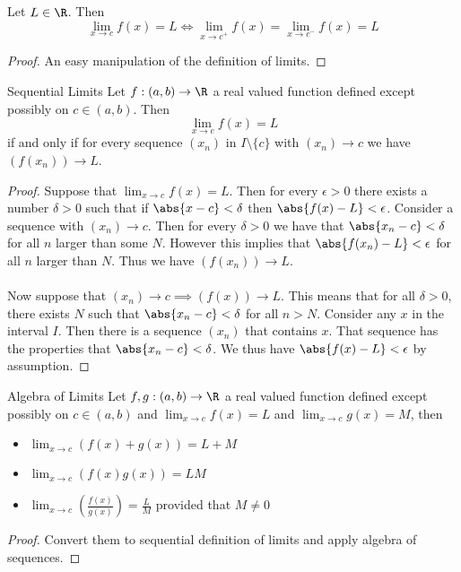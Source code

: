 \begin{lmm}{}{} Let $L\in\R$. Then $$\lim_{x\to c}f(x)=L\iff\lim_{x\to c^+}f(x)=\lim_{x\to c^-}f(x)=L$$ \tcbline
\begin{proof} An easy manipulation of the definition of limits. 
\end{proof}
\end{lmm}

\begin{thm}{Sequential Limits}{} Let $f:(a,b)\to\R$ a real valued function defined except possibly on $c\in(a,b)$. Then $$\lim_{x\to c}f(x)=L$$ if and only if for every sequence $(x_n)$ in $I\setminus\{c\}$ with $(x_n)\to c$ we have $(f(x_n))\to L$. \tcbline
\begin{proof} Suppose that $\lim_{x\to c}f(x)=L$. Then for every $\epsilon>0$ there exists a number $\delta>0$ such that if $\abs{x-c}<\delta$ then $\abs{f(x)-L}<\epsilon$. Consider a sequence with $(x_n)\to c$. Then for every $\delta>0$ we have that $\abs{x_n-c}<\delta$ for all $n$ larger than some $N$. However this implies that $\abs{f(x_n)-L}<\epsilon$ for all $n$ larger than $N$. Thus we have $(f(x_n))\to L$. \\~\\ 
Now suppose that $(x_n)\to c\implies (f(x))\to L$. This means that for all $\delta>0$, there exists $N$ such that $\abs{x_n-c}<\delta$ for all $n>N$. Consider any $x$ in the interval $I$. Then there is a sequence $(x_n)$ that contains $x$. That sequence has the properties that $\abs{x_n-c}<\delta$. We thus have $\abs{f(x)-L}<\epsilon$ by assumption. 
\end{proof}
\end{thm}

\begin{prp}{Algebra of Limits}{} Let $f,g:(a,b)\to\R$ a real valued function defined except possibly on $c\in(a,b)$ and $\lim_{x\to c}f(x)=L$ and $\lim_{x\to c}g(x)=M$, then
\begin{itemize}
\item $\lim_{x\to c}\left(f(x)+g(x)\right)=L+M$
\item $\lim_{x\to c}\left(f(x)g(x)\right)=LM$
\item $\lim_{x\to c}\left(\frac{f(x)}{g(x)}\right)=\frac{L}{M}$ provided that $M\neq 0$
\end{itemize}\tcbline
\begin{proof} Convert them to sequential definition of limits and apply algebra of sequences. 
\end{proof}
\end{prp}

